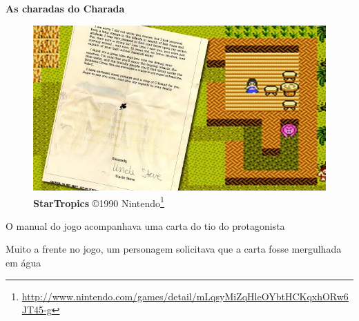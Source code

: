 \expandafter\documentclass\expandafter[table, usenames, svgnames, dvipsnames, \classopts]{beamer}
\begin{document}
\begin{frame}{\textbf{As charadas do Charada}}

	\begin{figure}
		\centering
		\includegraphics[height=0.3\paperheight]{startropics}
		\caption{\tiny \textbf{StarTropics} \copyright{1990} Nintendo\footnote{\url{http://www.nintendo.com/games/detail/mLqsyMiZqHleOYbtHCKqxhORw6JT45-g}}}
	\end{figure}

	\vspace{-1em}

	\begin{outline}
		\1 O manual do jogo acompanhava uma carta do tio do protagonista
			
		\vspace{1em}
		
		\1 Muito a frente no jogo, um personagem solicitava que a carta fosse mergulhada em água
	\end{outline}

\end{frame}
\end{document}
